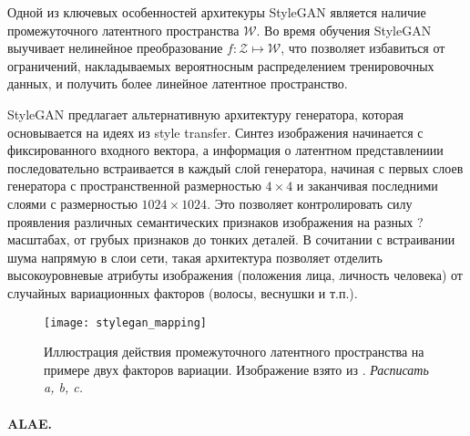 Одной из ключевых особенностей архитекуры StyleGAN является наличие промежуточного латентного пространства $\mathcal W$. Во время обучения StyleGAN выучивает нелинейное преобразование $f: \mathcal Z \mapsto \mathcal W$, что позволяет избавиться от ограничений, накладываемых вероятносным распределением тренировочных данных, и получить более линейное латентное пространство.

StyleGAN предлагает альтернативную архитектуру генератора, которая основывается на идеях из style transfer. 
Синтез изображения начинается с фиксированного входного вектора, а информация о латентном представлениии последовательно встраивается в каждый слой генератора, начиная с первых слоев генератора с пространственной размерностью $4\times4$ и заканчивая последними слоями с размерностью $1024\times1024$.
Это позволяет контролировать силу проявления различных семантических признаков изображения на разных ?масштабах, от грубых признаков до тонких деталей.
В сочитании с встраивании шума напрямую в слои сети, такая архитектура позволяет отделить высокоуровневые атрибуты изображения (положения лица, личность человека) от случайных вариационных факторов (волосы, веснушки и т.п.).

\begin{figure}[h]
\begin{center}
    \texttt{[image: stylegan\_mapping]}
    \caption{Иллюстрация действия промежуточного латентного пространства на примере двух факторов вариации. Изображение взято из \cite{StyleGAN}. \emph{Расписать a, b, c.}}
    \label{fig:stylegan-mapping}
\end{center}
\end{figure}


\paragraph{ALAE.}


